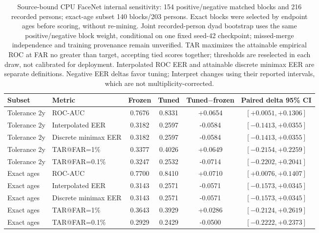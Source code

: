 \begin{table}[!t]
\caption{Source-bound CPU FaceNet internal sensitivity: 154 positive/negative matched blocks and 216 recorded persons; exact-age subset 140 blocks/203 persons. Exact blocks were selected by endpoint ages before scoring, without re-mining. Joint recorded-person dyad bootstrap uses the same positive/negative block weight, conditional on one fixed seed-42 checkpoint; missed-merge independence and training provenance remain unverified. TAR maximizes the attainable empirical ROC at FAR no greater than target, accepting tied scores together; thresholds are reselected in each draw, not calibrated for deployment. Interpolated ROC EER and attainable discrete minimax EER are separate definitions. Negative EER deltas favor tuning; Interpret changes using their reported intervals, which are not multiplicity-corrected.}
\label{tab:internal-roc-v2}
\centering\footnotesize
\begin{tabular}{@{}llcccc@{}}
\toprule
Subset & Metric & Frozen & Tuned & Tuned$-$frozen & Paired delta 95\% CI \\
\midrule
Tolerance 2y & ROC-AUC & 0.7676 & 0.8331 & +0.0654 & $[+0.0051,+0.1306]$ \\
Tolerance 2y & Interpolated EER & 0.3182 & 0.2597 & -0.0584 & $[-0.1413,+0.0355]$ \\
Tolerance 2y & Discrete minimax EER & 0.3182 & 0.2597 & -0.0584 & $[-0.1413,+0.0355]$ \\
Tolerance 2y & TAR@FAR=1\% & 0.3377 & 0.4026 & +0.0649 & $[-0.2154,+0.2259]$ \\
Tolerance 2y & TAR@FAR=0.1\% & 0.3247 & 0.2532 & -0.0714 & $[-0.2202,+0.2041]$ \\
Exact ages & ROC-AUC & 0.7700 & 0.8410 & +0.0710 & $[+0.0076,+0.1407]$ \\
Exact ages & Interpolated EER & 0.3143 & 0.2571 & -0.0571 & $[-0.1573,+0.0345]$ \\
Exact ages & Discrete minimax EER & 0.3143 & 0.2571 & -0.0571 & $[-0.1573,+0.0345]$ \\
Exact ages & TAR@FAR=1\% & 0.3643 & 0.3929 & +0.0286 & $[-0.2124,+0.2619]$ \\
Exact ages & TAR@FAR=0.1\% & 0.2929 & 0.2429 & -0.0500 & $[-0.2222,+0.2373]$ \\
\bottomrule
\end{tabular}
\end{table}
